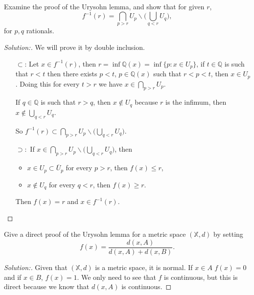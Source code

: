 \documentclass[a4paper,12pt, reqno]{article}
\theoremstyle{definition}
\newenvironment{exerr}[1]{
  \renewcommand\theexeralt{#1}
  \exeralt
}{\endexeralt}
\newenvironment{solution}{\begin{proof}[Solution:]}{\end{proof}}
\newcommand{\Q}{\mathbb{Q}}
\newcommand{\X}{\mathbb{X}}
\begin{document}
\begin{exerr}{1}
  Examine the proof of the Urysohn lemma, and show that for given $r$,
  \begin{equation*}
      f^{-1}(r) = \bigcap_{p>r}U_{p}\backslash\Big( \bigcup_{q<r} U_{q} \Big),
  \end{equation*}
  for $p,q$ rationals.
\end{exerr}
\begin{solution}
  We will prove it by double inclusion.
  \begin{itemize}
    \item[$\subset$:] Let $x\in f^{-1}(r)$, then $r = \inf\Q(x) = \inf\{ p : x\in U_{p} \}$, if $t\in \Q$ is such that $r<t$ then there exists $p<t$, $p\in\Q(x)$ such that $r<p<t$, then $x\in U_{p}$. Doing this for every $t>r$ we have $x\in\bigcap_{p>r}U_{p}$.
    
    If $q\in\Q$ is such that $r>q$, then $x\notin U_{q}$ because $r$ is the infimum, then $x\notin \bigcup_{q<r}U_{q}$.
    
    So $f^{-1}(r)\subset\bigcap_{p>r}U_{p}\backslash\Big( \bigcup_{q<r} U_{q} \Big)$.
    \item[$\supset:$] If $x\in\bigcap_{p>r}U_{p}\backslash \Big( \bigcup_{q<r} U_{q} \Big)$, then
    \begin{itemize}
      \item $x\in U_{p}\subset \overline{U}_{p}$ for every $p>r$, then $f(x) \leq r$,
      \item $x\notin U_{q}$ for every $q<r$, then $f(x) \geq r$.
    \end{itemize}
    Then $f(x) = r$ and $x\in f^{-1}(r)$.
  \end{itemize}
\end{solution}

\begin{exerr}{3}
  Give a direct proof of the Urysohn lemma for a metric space $(\X,d)$ by setting
  \begin{equation*}
      f(x) = \frac{d(x,A)}{d(x,A) + d(x,B)}.
  \end{equation*}
\end{exerr}
 \begin{solution}
  Given that $(\X,d)$ is a metric space, it is normal. If $x\in A$ $f(x) = 0$ and if $x\in B$, $f(x) =1$. We only need to see that $f$ is continuous, but this is direct because we know that $d(x,A)$ is continuous.
 \end{solution}
\end{document}
